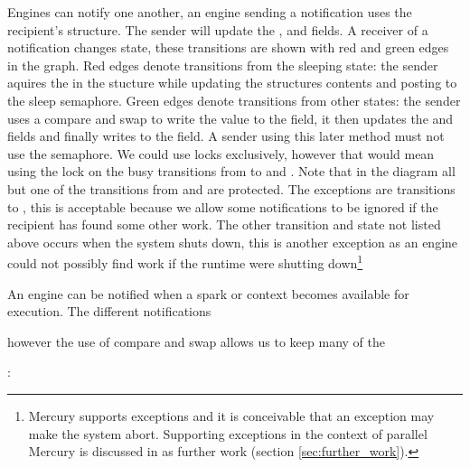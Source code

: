Engines can notify one another,
an engine sending a notification uses the recipient's \enginesleepsync
structure.
The sender will update the ,  and
 fields.
A receiver of a notification changes state,
these transitions are shown with red and green edges in the graph.
Red edges denote transitions from the sleeping state:
the sender aquires the  in the
\enginesleepsync stucture while updating the structures contents and posting
to the sleep semaphore. 
Green edges denote transitions from other states:
the sender uses a compare and swap to write the  value to the
 field,
it then updates the  and  fields
and finally writes  to the  field.
A sender using this later method must not use the semaphore.
We could use locks exclusively,
however that would mean using the lock on the busy transitions
from 
 to
 and 
.
Note that in the diagram all but one of the transitions from
 and 
are protected.
The exceptions are transitions to ,
this is acceptable because we allow some notifications to be ignored if the
recipient has found some other work.
The other transition and state not listed above occurs when the system shuts
down,
this is another exception as an engine could not possibly find work if the
runtime were shutting down\footnote{
    Mercury supports exceptions and it is conceivable that an exception may
    make the system abort.
    Supporting exceptions in the context of parallel Mercury is discussed in
    as further work (section \ref{sec:further_work}).
}

An engine can be notified when a spark or context becomes available for
execution.
The different notifications  

however the use of compare and swap allows
us to keep many of the 

\begin{description}
    \item[:] 
\end{description}

